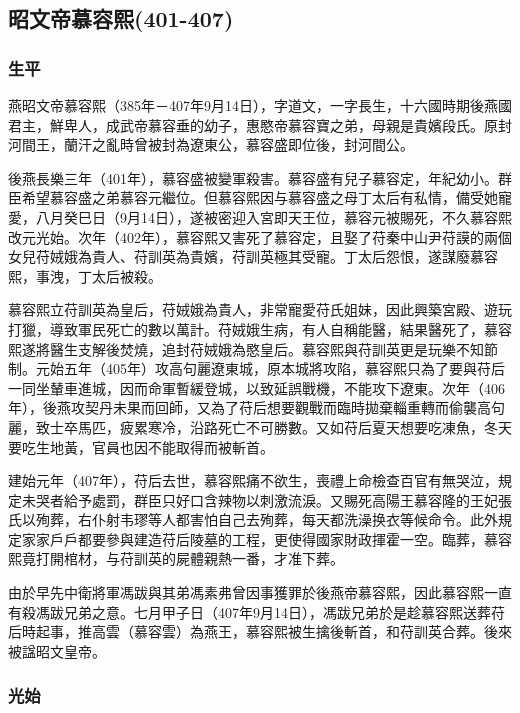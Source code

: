 
\subsection{昭文帝慕容熙\tiny(401-407)}

\subsubsection{生平}

燕昭文帝慕容熙（385年－407年9月14日），字道文，一字長生，十六國時期後燕國君主，鮮卑人，成武帝慕容垂的幼子，惠愍帝慕容寶之弟，母親是貴嬪段氏。原封河間王，蘭汗之亂時曾被封為遼東公，慕容盛即位後，封河間公。

後燕長樂三年（401年），慕容盛被變軍殺害。慕容盛有兒子慕容定，年紀幼小。群臣希望慕容盛之弟慕容元繼位。但慕容熙因与慕容盛之母丁太后有私情，備受她寵愛，八月癸巳日（9月14日），遂被密迎入宮即天王位，慕容元被賜死，不久慕容熙改元光始。次年（402年），慕容熙又害死了慕容定，且娶了苻秦中山尹苻謨的兩個女兒苻娀娥為貴人、苻訓英為貴嬪，苻訓英極其受寵。丁太后怨恨，遂謀廢慕容熙，事洩，丁太后被殺。

慕容熙立苻訓英為皇后，苻娀娥為貴人，非常寵愛苻氏姐妹，因此興築宮殿、遊玩打獵，導致軍民死亡的數以萬計。苻娀娥生病，有人自稱能醫，結果醫死了，慕容熙遂將醫生支解後焚燒，追封苻娀娥為愍皇后。慕容熙與苻訓英更是玩樂不知節制。元始五年（405年）攻高句麗遼東城，原本城將攻陷，慕容熙只為了要與苻后一同坐輦車進城，因而命軍暫緩登城，以致延誤戰機，不能攻下遼東。次年（406年），後燕攻契丹未果而回師，又為了苻后想要觀戰而臨時拋棄輜重轉而偷襲高句麗，致士卒馬匹，疲累寒冷，沿路死亡不可勝數。又如苻后夏天想要吃凍魚，冬天要吃生地黃，官員也因不能取得而被斬首。

建始元年（407年），苻后去世，慕容熙痛不欲生，喪禮上命檢查百官有無哭泣，規定未哭者給予處罰，群臣只好口含辣物以刺激流淚。又賜死高陽王慕容隆的王妃張氏以殉葬，右仆射韦璆等人都害怕自己去殉葬，每天都洗澡换衣等候命令。此外規定家家戶戶都要參與建造苻后陵墓的工程，更使得國家財政揮霍一空。臨葬，慕容熙竟打開棺材，与苻訓英的屍體親熱一番，才准下葬。

由於早先中衛將軍馮跋與其弟馮素弗曾因事獲罪於後燕帝慕容熙，因此慕容熙一直有殺馮跋兄弟之意。七月甲子日（407年9月14日），馮跋兄弟於是趁慕容熙送葬苻后時起事，推高雲（慕容雲）為燕王，慕容熙被生擒後斬首，和苻訓英合葬。後來被諡昭文皇帝。

\subsubsection{光始}

